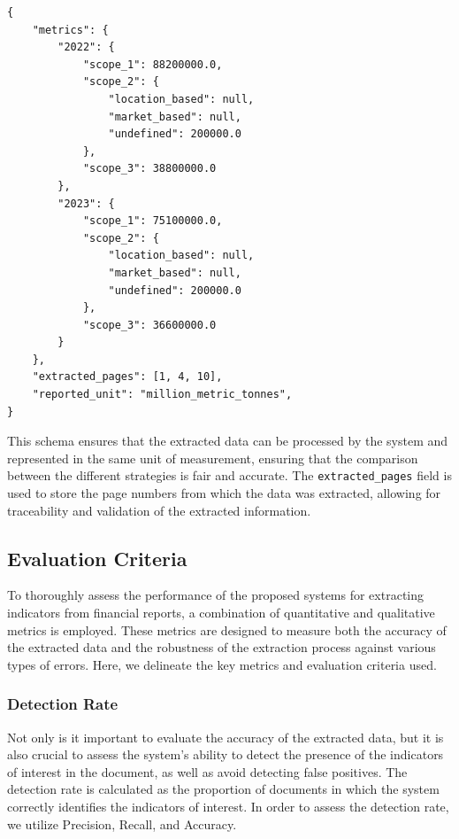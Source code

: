 \documentclass[english, 12pt, a4paper, elec, utf8, a-2b, online]{aaltothesis}
\begin{document}
\begin{verbatim}
{
    "metrics": {
        "2022": {
            "scope_1": 88200000.0,
            "scope_2": {
                "location_based": null,
                "market_based": null,
                "undefined": 200000.0
            },
            "scope_3": 38800000.0
        },
        "2023": {
            "scope_1": 75100000.0,
            "scope_2": {
                "location_based": null,
                "market_based": null,
                "undefined": 200000.0
            },
            "scope_3": 36600000.0
        }
    },
    "extracted_pages": [1, 4, 10],
    "reported_unit": "million_metric_tonnes",
}
\end{verbatim}

This schema ensures that the extracted data can be processed by the system and represented in the same unit of measurement, ensuring that the comparison between the different strategies is fair and accurate.
The \texttt{extracted\_pages} field is used to store the page numbers from which the data was extracted, allowing for traceability and validation of the extracted information.

\subsection{Evaluation Criteria}
\label{sec:evaluation_criteria}

To thoroughly assess the performance of the proposed systems for extracting indicators from financial reports, a combination of quantitative and qualitative metrics is employed.
These metrics are designed to measure both the accuracy of the extracted data and the robustness of the extraction process against various types of errors.
Here, we delineate the key metrics and evaluation criteria used.

\subsubsection{Detection Rate}

Not only is it important to evaluate the accuracy of the extracted data, but it is also crucial to assess the system's ability to detect the presence of the indicators of interest in the document, as well as avoid detecting false positives.
The detection rate is calculated as the proportion of documents in which the system correctly identifies the indicators of interest.
In order to assess the detection rate, we utilize Precision, Recall, and Accuracy.
\end{document}

